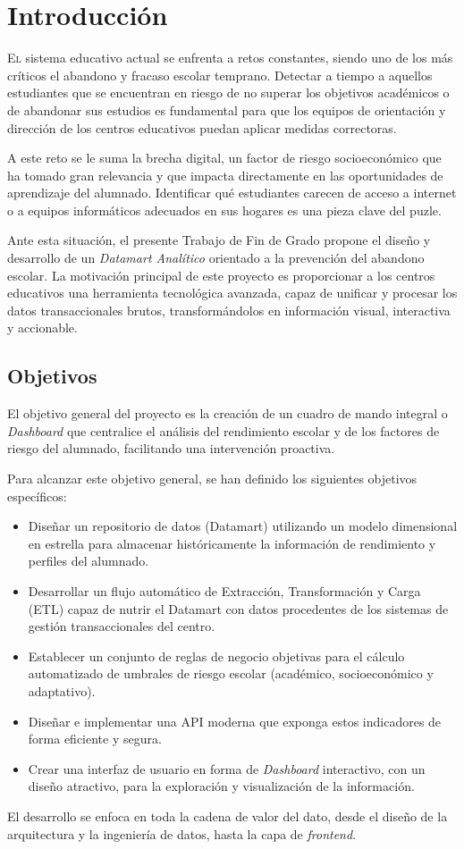 ﻿\chapter{Introducción}
\label{chap:introduccion}

\lettrine{E}{l} sistema educativo actual se enfrenta a retos constantes, siendo uno de los más críticos el abandono y fracaso escolar temprano. Detectar a tiempo a aquellos estudiantes que se encuentran en riesgo de no superar los objetivos académicos o de abandonar sus estudios es fundamental para que los equipos de orientación y dirección de los centros educativos puedan aplicar medidas correctoras.

A este reto se le suma la brecha digital, un factor de riesgo socioeconómico que ha tomado gran relevancia y que impacta directamente en las oportunidades de aprendizaje del alumnado. Identificar qué estudiantes carecen de acceso a internet o a equipos informáticos adecuados en sus hogares es una pieza clave del puzle.

Ante esta situación, el presente Trabajo de Fin de Grado propone el diseño y desarrollo de un \textit{Datamart Analítico} orientado a la prevención del abandono escolar. La motivación principal de este proyecto es proporcionar a los centros educativos una herramienta tecnológica avanzada, capaz de unificar y procesar los datos transaccionales brutos, transformándolos en información visual, interactiva y accionable.

\section{Objetivos}
\label{sec:objetivos}

El objetivo general del proyecto es la creación de un cuadro de mando integral o \textit{Dashboard} que centralice el análisis del rendimiento escolar y de los factores de riesgo del alumnado, facilitando una intervención proactiva. 

Para alcanzar este objetivo general, se han definido los siguientes objetivos específicos:

\begin{itemize}
    \item Diseñar un repositorio de datos (Datamart) utilizando un modelo dimensional en estrella para almacenar históricamente la información de rendimiento y perfiles del alumnado.
    \item Desarrollar un flujo automático de Extracción, Transformación y Carga (ETL) capaz de nutrir el Datamart con datos procedentes de los sistemas de gestión transaccionales del centro.
    \item Establecer un conjunto de reglas de negocio objetivas para el cálculo automatizado de umbrales de riesgo escolar (académico, socioeconómico y adaptativo).
    \item Diseñar e implementar una API moderna que exponga estos indicadores de forma eficiente y segura.
    \item Crear una interfaz de usuario en forma de \textit{Dashboard} interactivo, con un diseño atractivo, para la exploración y visualización de la información.
\end{itemize}

El desarrollo se enfoca en toda la cadena de valor del dato, desde el diseño de la arquitectura y la ingeniería de datos, hasta la capa de \textit{frontend}.
